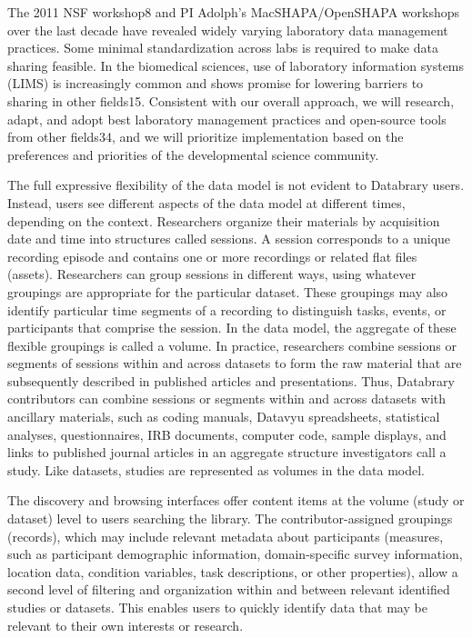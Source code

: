 \documentclass[letterpaper,man,apacite]{apa6}
\begin{document}
The 2011 NSF workshop8 and PI Adolph's MacSHAPA/OpenSHAPA workshops over the last decade have revealed widely varying laboratory data management practices. Some minimal standardization across labs is required to make data sharing feasible. 
In the biomedical sciences, use of laboratory information systems (LIMS) is increasingly common and shows promise for lowering barriers to sharing in other fields15. 
Consistent with our overall approach, we will research, adapt, and adopt best laboratory management practices and open-source tools from other fields34, and we will prioritize implementation based on the preferences and priorities of the developmental science community.

The full expressive flexibility of the data model is not evident to Databrary users. 
Instead, users see different aspects of the data model at different times, depending on the context. Researchers organize their materials by acquisition date and time into structures called sessions.
A session corresponds to a unique recording episode and contains one or more recordings or related flat files (assets). Researchers can group sessions in different ways, using whatever groupings are appropriate for
the particular dataset. 
These groupings may also identify particular time segments of a recording to distinguish tasks, events, or
participants that comprise the session. 
In the data model, the aggregate of these flexible groupings is called a volume. 
In practice, researchers combine sessions or segments of sessions within and across datasets to
form the raw material that are subsequently described in published
articles and presentations. 
Thus, Databrary contributors can combine sessions or segments within and across datasets with ancillary
materials, such as coding manuals, Datavyu spreadsheets, statistical analyses, questionnaires, IRB documents, computer code, sample displays, and links to published journal articles in an aggregate structure
investigators call a study. 
Like datasets, studies are represented as volumes in the data model.

The discovery and browsing interfaces offer content items at the volume (study or dataset) level to users searching the library. The contributor-assigned groupings (records), which may include relevant
metadata about participants (measures, such as participant demographic information, domain-specific survey information, location data, condition variables, task descriptions, or other properties), allow a
second level of filtering and organization within and between relevant
identified studies or datasets.
This enables users to quickly identify data that may be relevant to their own interests or research.
\end{document}
